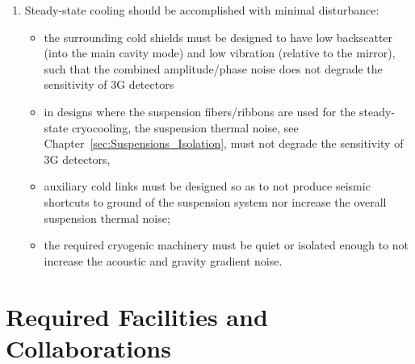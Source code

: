 \begin{enumerate}
\item Steady-state cooling should be accomplished with minimal disturbance:
      \begin{itemize}
        \item the surrounding cold shields must be designed to have low backscatter (into the main cavity mode) and low vibration (relative to the mirror), such that the combined amplitude/phase noise does not degrade the sensitivity of \ac{3G} detectors
        \item in designs where the suspension fibers/ribbons are used for the steady-state cryocooling, the suspension thermal noise, see Chapter~\ref{sec:Suspensions_Isolation}, must not degrade the sensitivity of \ac{3G} detectors,
        \item auxiliary cold links must be designed so as to not produce seismic shortcuts to ground of the suspension system nor increase the overall suspension thermal noise;
        \item the required cryogenic machinery must be quiet or isolated enough to not increase the acoustic and gravity gradient noise.
      \end{itemize}
\end{enumerate}

%


\section{Required Facilities and Collaborations}

